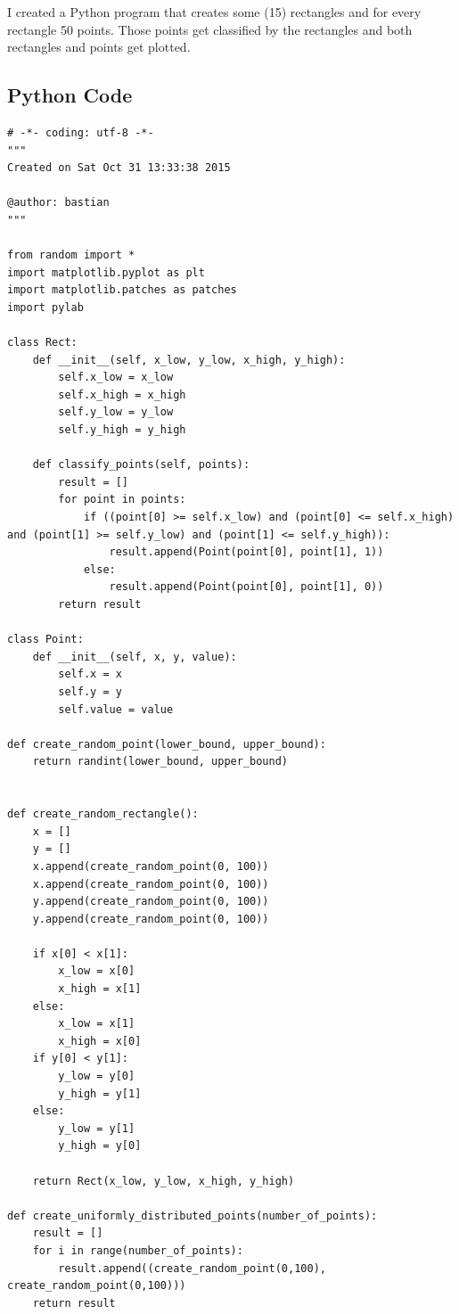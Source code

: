 \documentclass[paper=a4, fontsize=11pt]{scrartcl} %
\numberwithin{equation}{section} %
\numberwithin{figure}{section} %
\numberwithin{table}{section} %
\begin{document}
I created a Python program that creates some (15) rectangles and for every rectangle 50 points. Those points get classified by the rectangles and both rectangles and points get plotted.

\subsection{Python Code}

\begin{lstlisting}
# -*- coding: utf-8 -*-
"""
Created on Sat Oct 31 13:33:38 2015

@author: bastian
"""

from random import *
import matplotlib.pyplot as plt
import matplotlib.patches as patches
import pylab

class Rect:
    def __init__(self, x_low, y_low, x_high, y_high):
        self.x_low = x_low
        self.x_high = x_high
        self.y_low = y_low
        self.y_high = y_high
        
    def classify_points(self, points):
        result = []
        for point in points:
            if ((point[0] >= self.x_low) and (point[0] <= self.x_high) and (point[1] >= self.y_low) and (point[1] <= self.y_high)):
                result.append(Point(point[0], point[1], 1))
            else:
                result.append(Point(point[0], point[1], 0))
        return result
        
class Point:
    def __init__(self, x, y, value):
        self.x = x
        self.y = y
        self.value = value

def create_random_point(lower_bound, upper_bound):
    return randint(lower_bound, upper_bound)
    
    
def create_random_rectangle():
    x = []
    y = []
    x.append(create_random_point(0, 100))
    x.append(create_random_point(0, 100))
    y.append(create_random_point(0, 100))
    y.append(create_random_point(0, 100))
    
    if x[0] < x[1]:
        x_low = x[0]
        x_high = x[1]
    else:
        x_low = x[1]
        x_high = x[0]
    if y[0] < y[1]:
        y_low = y[0]
        y_high = y[1]
    else:
        y_low = y[1]
        y_high = y[0]
    
    return Rect(x_low, y_low, x_high, y_high)
    
def create_uniformly_distributed_points(number_of_points):
    result = []
    for i in range(number_of_points):
        result.append((create_random_point(0,100), create_random_point(0,100)))     
    return result


\end{lstlisting}
\end{document}
